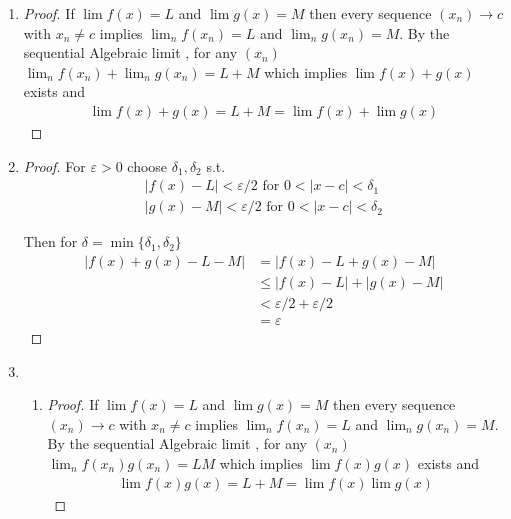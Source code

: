 \begin{enumerate}[label=(\alph*)]
    \item 
    \begin{proof}
        If $\lim f(x)=L$ and $\lim g(x)=M$ then 
        every sequence $(x_n)\rightarrow c$ with $x_n\neq c$ implies
        $\lim_n f(x_n)=L$ and $\lim_n g(x_n) = M$.
        By the sequential Algebraic limit \Thm, for any $(x_n)$
        $\lim_n f(x_n) + \lim_n g(x_n) = L+M$ which implies
        $\lim f(x)+g(x)$ exists and 
        \begin{align}
            \lim f(x) + g(x)  = L+M = \lim f(x) + \lim g(x)
        \end{align}
    \end{proof}

    \item
    \begin{proof}
        For $\varepsilon>0$ choose $\delta_1, \delta_2$ s.t. 
        \begin{gather*}
            |f(x)-L| < \varepsilon/2 \text{ for } 0<|x-c|<\delta_1 \\
            |g(x)-M| < \varepsilon/2 \text{ for } 0<|x-c|<\delta_2
        \end{gather*}

        Then for $\delta = \min\{\delta_1, \delta_2\}$
        \begin{align*}
            |f(x)+g(x)- L - M| &= |f(x)-L+g(x) - M| \\
                            &\leq  |f(x)-L|+|g(x) - M| \\
                            &<  \varepsilon/2 + \varepsilon/2 \\
                            &= \varepsilon
        \end{align*}
    \end{proof}

    \item
    \begin{enumerate}
        \item 
        \begin{proof}
            If $\lim f(x)=L$ and $\lim g(x)=M$ then 
            every sequence $(x_n)\rightarrow c$ with $x_n\neq c$ implies
            $\lim_n f(x_n)=L$ and $\lim_n g(x_n) = M$.
            By the sequential Algebraic limit \Thm, for any $(x_n)$
            $\lim_n f(x_n) g(x_n) = LM$ which implies
            $\lim f(x) g(x)$ exists and 
            \begin{align}
                \lim f(x) g(x)  = L+M = \lim f(x) \lim g(x)
            \end{align}
        \end{proof}
    


\end{enumerate}
\end{enumerate}
